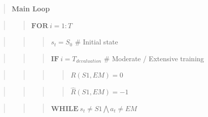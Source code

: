 \documentclass[10pt,a4paper,onecolumn]{article}
\begin{document}
\begin{quote}
\textbf{Main Loop}
\end{quote}

\begin{quote}
\begin{quote}
\(\textbf{FOR}\ i = 1:T\)
\end{quote}
\end{quote}

\begin{quote}
\begin{quote}
\begin{quote}
\(s_t = S_0\) \(\#\) Initial state
\end{quote}
\end{quote}
\end{quote}

\begin{quote}
\begin{quote}
\begin{quote}
\(\textbf{IF}\ i = T_{devaluation}\) \(\#\) Moderate / Extensive
training
\end{quote}
\end{quote}
\end{quote}

\begin{quote}
\begin{quote}
\begin{quote}
\begin{quote}
\(R(S1, EM) = 0\)
\end{quote}
\end{quote}
\end{quote}
\end{quote}

\begin{quote}
\begin{quote}
\begin{quote}
\begin{quote}
\(\hat{R}(S1, EM) = -1\)
\end{quote}
\end{quote}
\end{quote}
\end{quote}

\begin{quote}
\begin{quote}
\begin{quote}
\(\textbf{WHILE}\ s_t \neq S1 \bigwedge a_t \neq EM\)
\end{quote}
\end{quote}
\end{quote}
\end{document}
